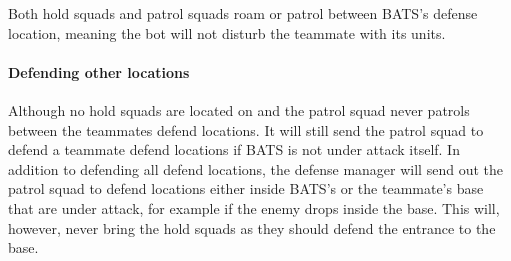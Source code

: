 Both hold squads and patrol squads roam or patrol between BATS’s defense location, meaning the bot will not disturb the teammate with its units.

\paragraph{Defending other locations}
Although no hold squads are located on and the patrol squad never patrols between the teammates defend locations. It will still send the patrol squad to defend a teammate defend locations if BATS is not under attack itself. In addition to defending all defend locations, the defense manager will send out the patrol squad to defend locations either inside BATS’s or the teammate's base that are under attack, for example if the enemy drops inside the base. This will, however, never bring the hold squads as they should defend the entrance to the base.